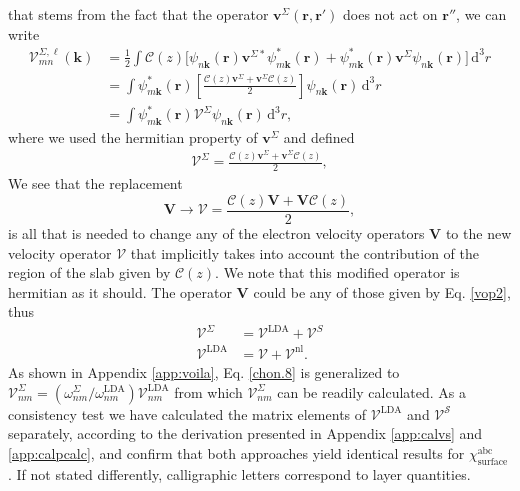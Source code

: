 that stems from the fact that the operator
$\mathbf{v}^\Sigma(\mathbf{r},\mathbf{r}')$ does not act on $\mathbf{r}''$, we
can write
\begin{align}\label{nl.3}
\boldsymbol{\mathcal{V}}^{\Sigma,\ell}_{mn}({\mathbf k})
&=
\frac{1}{2}
\int 
 \boldsymbol{\mathcal{C}}(z)
 \bigg[
\psi_{n\mathbf{k}}(\mathbf{r})
\mathbf{v}^{\Sigma *}\psi^{*}_{m\mathbf{k}}(\mathbf{r})
+ 
\psi^*_{m\mathbf{k}}(\mathbf{r})\mathbf{v}^{\Sigma}
\psi_{n\mathbf{k}}(\mathbf{r})
\bigg]\,\mathrm{d}^3 r
\nonumber\\
&=
\int 
\psi^*_{m\mathbf{k}}(\mathbf{r})
\left[\frac{\boldsymbol{\mathcal{C}}(z) \mathbf{v}^\Sigma +
\mathbf{v}^\Sigma \boldsymbol{\mathcal{C}}(z)}{2}\right]
\psi_{n\mathbf{k}}(\mathbf{r})\,\mathrm{d}^3 r
\nonumber\\
&=
\int 
\psi^*_{m\mathbf{k}}(\mathbf{r})
\boldsymbol{\mathcal{V}}^{\Sigma}
\psi_{n\mathbf{k}}(\mathbf{r})\,\mathrm{d}^3 r
,
\end{align}
where we used the hermitian property of $\mathbf{v}^\Sigma$ and defined
\begin{align}\label{nl.4}
\boldsymbol{\mathcal{V}}^{\Sigma}
= \frac{\boldsymbol{\mathcal{C}}(z) \mathbf{v}^\Sigma
+ \mathbf{v}^\Sigma \boldsymbol{\mathcal{C}}(z)}{2},
\end{align} 
We see that the replacement
\begin{equation}
\mathbf{V} \to \boldsymbol{\mathcal{V}}
= \frac{\boldsymbol{\mathcal{C}}(z) \mathbf{V}
+ \mathbf{V} \boldsymbol{\mathcal{C}}(z)}{2},
\label{vcali}
\end{equation} 
is all that is needed to change any of the electron velocity operators
$\mathbf{V}$ to the new velocity operator $\boldsymbol{\mathcal{V}}$ that
implicitly takes into account the contribution of the region of the slab given
by $\boldsymbol{\mathcal{C}}(z)$. We note that this modified operator is
hermitian as it should.\cite{note2} The operator $\mathbf{V}$ could be any of
those given by Eq. \eqref{vop2}, thus
\begin{align}\label{vopii}
\boldsymbol{\mathcal{V}}^{\Sigma}
&= \boldsymbol{\mathcal{V}}^{\mathrm{LDA}}
+ \boldsymbol{\mathcal{V}}^{S}\nonumber\\
\boldsymbol{\mathcal{V}}^{\mathrm{LDA}} 
&= \boldsymbol{\mathcal{V}}
+ \boldsymbol{\mathcal{V}}^{\mathrm{nl}}.
\end{align}
As shown in Appendix \ref{app:voila}, Eq. \eqref{chon.8} is generalized to
$\boldsymbol{\mathcal{V}}^{\Sigma}_{nm} =
(\omega^\Sigma_{nm}/\omega^{\mathrm{LDA}}_{nm})
\boldsymbol{\mathcal{V}}^{\mathrm{LDA}}_{nm}$ from which
$\boldsymbol{\mathcal{V}}^{\Sigma}_{nm}$ can be readily calculated. As a
consistency test we have calculated the matrix elements of
$\boldsymbol{\mathcal{V}}^{\mathrm{LDA}}$ and
$\boldsymbol{\mathcal{V}}^{\mathcal{S}}$ separately, according to the derivation
presented in Appendix \ref{app:calvs} and \ref{app:calpcalc}, and confirm that
both approaches yield identical results for
$\chi^{\mathrm{abc}}_{\mathrm{surface}}$. If not stated differently,
calligraphic letters correspond to layer quantities.

